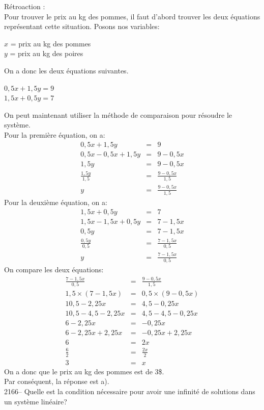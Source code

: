\documentclass[letterpaper, 12pt]{article}
\begin{document}
R\'etroaction :\\
Pour trouver le prix au kg des pommes, il faut d'abord trouver les deux \'equations repr\'esentant cette situation. Posons nos variables:
\begin{center}
 $x$ = prix au kg des pommes\\
$y$ = prix au kg des poires
\end{center}
On a donc les deux \'equations suivantes.
\begin{center}
$0,5x+1,5y=9$ \\
$1,5x+0,5y=7$\\
\end{center}
On peut maintenant utiliser la m\'ethode de comparaison pour r\'esoudre le syst\`eme.\\
Pour la premi\`ere \'equation, on a:
\begin{eqnarray*}
0,5x+1,5y&=&9 \\
0,5x-0,5x+1,5y&=&9-0,5x \\
1,5y&=&9-0,5x\\
\frac{1,5y}{1,5}&=&\frac{9-0,5x}{1,5}\\
y&=&\frac{9-0,5x}{1,5}
\end{eqnarray*}
Pour la deuxi\`eme \'equation, on a:
\begin{eqnarray*}
1,5x+0,5y&=&7\\
1,5x-1,5x+0,5y&=&7-1,5x\\
0,5y&=&7-1,5x\\
\frac{0,5y}{0,5}&=&\frac{7-1,5x}{0,5}\\
y&=&\frac{7-1,5x}{0,5}
\end{eqnarray*}
On compare les deux \'equations:
\begin{eqnarray*}
\frac{7-1,5x}{0,5}&=&\frac{9-0,5x}{1,5}\\
1,5\times(7-1,5x)&=&0,5\times(9-0,5x)\\
10,5-2,25x&=&4,5-0,25x\\
10,5-4,5-2,25x&=&4,5-4,5-0,25x\\
6-2,25x&=&-0,25x\\
6-2,25x+2,25x&=&-0,25x+2,25x\\
6&=&2x\\[2mm]
\frac{6}{2}&=&\frac{2x}{2}\\[2mm]
3&=&x
\end{eqnarray*}
On a donc que le prix au kg des pommes est de 3\$. \\
Par cons\'equent, la r\'eponse est a).\\

2166-- Quelle est la condition n\'ecessaire pour avoir une infinit\'e de solutions dans un syst\`eme lin\'eaire?\\
\end{document}
